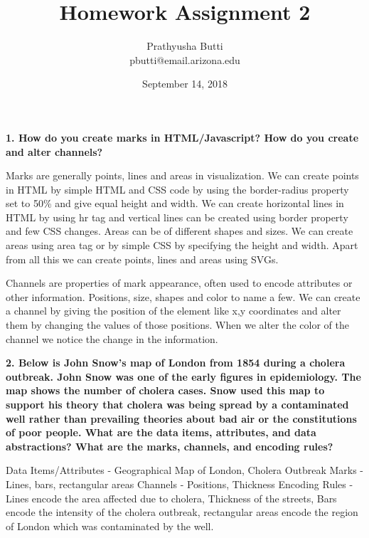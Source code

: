 \documentclass{article}[12pt]
\begin{document}
\title{Homework Assignment 2 \\
	}
\date{September 14, 2018}

\author{
   Prathyusha Butti \\
   pbutti@email.arizona.edu
}

\maketitle

\noindent
{\bf 1. How do you create marks in HTML/Javascript? How do you create and alter channels?}

{
	Marks are generally points, lines and areas in visualization.
	We can create points in HTML by simple HTML and CSS code by using the border-radius property set to 50\% and give equal height and width. 
    We can create horizontal lines in HTML by using hr tag and vertical lines can be created using border property and few CSS changes. 
    Areas can be of different shapes and sizes. We can create areas using area tag or by simple CSS by specifying the height and width. 
	Apart from all this we can create points, lines and areas using SVGs.
    
    Channels are properties of mark appearance, often used to encode attributes or other information. Positions, size, shapes and color to name a few. We can create a channel by giving the position of the element like x,y coordinates and alter them by changing the values of those positions. When we alter the color of the channel we notice the change in the information.
    
}




\vspace{2ex}\noindent
{\bf 2. Below is John Snow's map of London from 1854 during a cholera outbreak. John Snow was one of the early figures in epidemiology. The map shows the number of cholera cases. Snow used this map to support his theory that cholera was being spread by a contaminated well rather than prevailing theories about bad air or the constitutions of poor people. What are the data items, attributes, and data abstractions? What are the marks, channels, and encoding rules? }

{
	Data Items/Attributes - Geographical Map of London,  Cholera Outbreak
	Marks -  Lines, bars, rectangular areas
	Channels - Positions, Thickness 
	Encoding Rules - Lines encode the area affected due to cholera, Thickness of the streets, Bars encode the intensity of the cholera outbreak, rectangular areas encode the region of London which was contaminated by the well.
}
\end{document}
